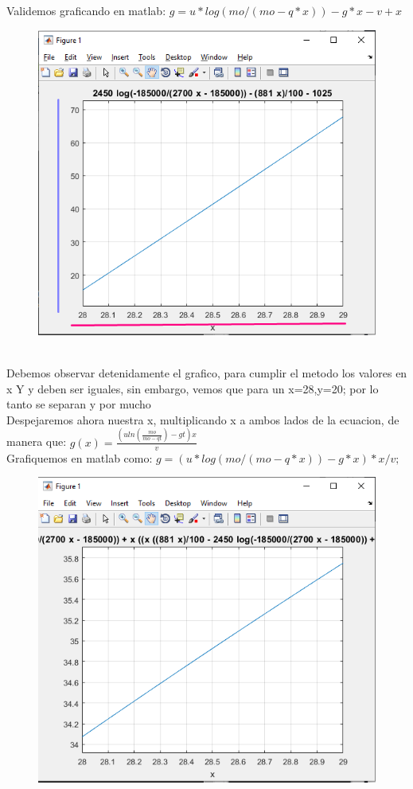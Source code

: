 \documentclass{article}
\theoremstyle{mytheoremstyle}
\theoremstyle{mytheoremstyle}
\theoremstyle{myproblemstyle}
\begin{document}
Validemos graficando en matlab: $g=u*log(mo/(mo-q*x))-g*x-v+x$
\begin{figure}[ht]
    \includegraphics[scale=0.5]{img/stf28_3.png}
    
\end{figure}
\\Debemos observar detenidamente el grafico, para cumplir el metodo los valores en x Y y
    deben ser iguales, sin embargo, vemos que para un x=28,y=20; por lo tanto se separan y por
    mucho
\\Despejaremos ahora nuestra x, multiplicando x a ambos lados de la ecuacion, de manera que: $g(x)=\frac{(uln(\frac{mo}{mo-qt})-gt)x}{v}$
\\Grafiquemos en matlab como:  $g=(u*log(mo/(mo-q*x))-g*x)*x/v;$
\pagebreak
\begin{figure}[ht]
    \includegraphics[scale=0.55]{img/stf28_4.png}
\end{figure}
\end{document}
